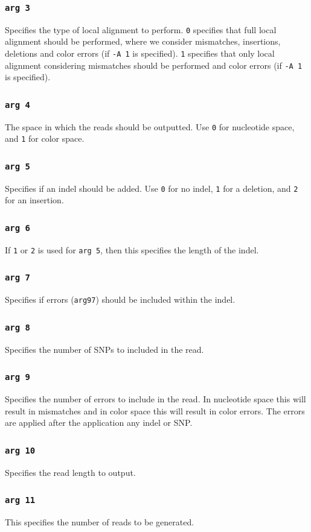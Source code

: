 \documentclass[a4paper,12pt]{book}
\newcommand{\TT}[1]{{\tt #1}} %
\begin{document}
\subsubsection{\TT{arg 3}}
Specifies the type of local alignment to perform.
\TT{0} specifies that full local alignment should be performed, where we consider mismatches, insertions, deletions and color errors (if \TT{-A 1} is specified).
\TT{1} specifies that only local alignment considering mismatches should be performed and color errors (if \TT{-A 1} is specified).
\subsubsection{\TT{arg 4}}
The space in which the reads should be outputted.
Use \TT{0} for nucleotide space, and \TT{1} for color space.
\subsubsection{\TT{arg 5}}
Specifies if an indel should be added.
Use \TT{0} for no indel, \TT{1} for a deletion, and \TT{2} for an insertion.
\subsubsection{\TT{arg 6}}
If \TT{1} or \TT{2} is used for \TT{arg 5}, then this specifies the length of the indel.
\subsubsection{\TT{arg 7}}
Specifies if errors (\TT{arg97}) should be included within the indel. 
\subsubsection{\TT{arg 8}}
Specifies the number of SNPs to included in the read.
\subsubsection{\TT{arg 9}}
Specifies the number of errors to include in the read.
In nucleotide space this will result in mismatches and in color space this will result in color errors.
The errors are applied after the application any indel or SNP.
\subsubsection{\TT{arg 10}}
Specifies the read length to output.
\subsubsection{\TT{arg 11}}
This specifies the number of reads to be generated.
\end{document}
